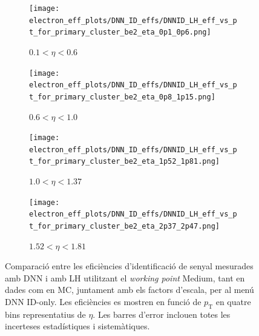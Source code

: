 \begin{figure}[h]
  \centering

  \begin{subfigure}[b]{0.48\textwidth}
    \centering
    \texttt{[image: electron\_eff\_plots/DNN\_ID\_effs/DNNID\_LH\_eff\_vs\_pt\_for\_primary\_cluster\_be2\_eta\_0p1\_0p6.png]}
    \caption{$0.1 < \eta < 0.6$}
    \label{res:eff_dnn_lh_etabin1}
  \end{subfigure}
  \hfill
  \begin{subfigure}[b]{0.48\textwidth}
    \centering
    \texttt{[image: electron\_eff\_plots/DNN\_ID\_effs/DNNID\_LH\_eff\_vs\_pt\_for\_primary\_cluster\_be2\_eta\_0p8\_1p15.png]}
    \caption{$0.6 < \eta < 1.0$}
    \label{res:eff_dnn_lh_etabin2}
  \end{subfigure}

  \vspace{0.5cm}

  \begin{subfigure}[b]{0.48\textwidth}
    \centering
    \texttt{[image: electron\_eff\_plots/DNN\_ID\_effs/DNNID\_LH\_eff\_vs\_pt\_for\_primary\_cluster\_be2\_eta\_1p52\_1p81.png]}
    \caption{$1.0 < \eta < 1.37$}
    \label{res:eff_dnn_lh_etabin3}
  \end{subfigure}
  \hfill
  \begin{subfigure}[b]{0.48\textwidth}
    \centering
    \texttt{[image: electron\_eff\_plots/DNN\_ID\_effs/DNNID\_LH\_eff\_vs\_pt\_for\_primary\_cluster\_be2\_eta\_2p37\_2p47.png]}
    \caption{$1.52 < \eta < 1.81$}
    \label{res:eff_dnn_lh_etabin4}
  \end{subfigure}
  \caption{
    Comparació entre les eficiències d’identificació de senyal mesurades amb DNN i amb LH utilitzant el \textit{working point} Medium, 
    tant en dades com en MC, juntament amb els factors d’escala, per al menú DNN ID-only.  
    Les eficiències es mostren en funció de $p_{\mathrm{T}}$ en quatre bins representatius de $\eta$.  
    Les barres d’error inclouen totes les incerteses estadístiques i sistemàtiques.}
  \label{res:eff_sfs_dnn_vs_lh_pt_4etabins}
\end{figure}

